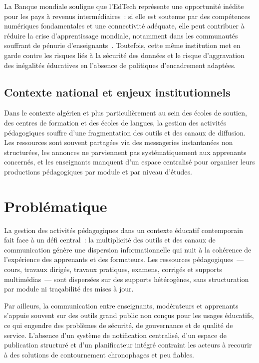 \documentclass[12pt,a4paper,oneside]{report}
\begin{document}
La Banque mondiale souligne que l'EdTech repr\'esente une opportunit\'e in\'edite pour les pays \`a revenus interm\'ediaires~: si elle est soutenue par des comp\'etences num\'eriques fondamentales et une connectivit\'e ad\'equate, elle peut contribuer \`a r\'eduire la crise d'apprentissage mondiale, notamment dans les communaut\'es souffrant de p\'enurie d'enseignants~\cite{worldbank_edtech_2026}. Toutefois, cette m\^eme institution met en garde contre les risques li\'es \`a la s\'ecurit\'e des donn\'ees et le risque d'aggravation des in\'egalit\'es \'educatives en l'absence de politiques d'encadrement adapt\'ees.

\subsection{Contexte national et enjeux institutionnels}

Dans le contexte alg\'erien et plus particuli\`erement au sein des écoles de soutien, des centres de formation et des écoles de langues, la gestion des activit\'es p\'edagogiques souffre d'une fragmentation des outils et des canaux de diffusion. Les ressources sont souvent partag\'ees via des messageries instantan\'ees non structur\'ees, les annonces ne parviennent pas syst\'ematiquement aux apprenants concern\'es, et les enseignants manquent d'un espace centralis\'e pour organiser leurs productions p\'edagogiques par module et par niveau d'\'études.

\section{Probl\'ematique}
\label{sec:problématique}

La gestion des activit\'es p\'edagogiques dans un contexte éducatif contemporain fait face \`a un d\'efi central~: la multiplicit\'e des outils et des canaux de communication g\'en\`ere une dispersion informationnelle qui nuit \`a la coh\'erence de l'exp\'erience des apprenants et des formateurs. Les ressources p\'edagogiques~--- cours, travaux dirig\'es, travaux pratiques, examens, corrig\'es et supports multim\'edias~--- sont dispers\'ees sur des supports h\'et\'erog\`enes, sans structuration par module ni tra\c{c}abilit\'e des mises \`a jour.

Par ailleurs, la communication entre enseignants, mod\'erateurs et apprenants s'appuie souvent sur des outils grand public non con\c{c}us pour les usages éducatifs, ce qui engendre des probl\`emes de s\'ecurit\'e, de gouvernance et de qualit\'e de service. L'absence d'un syst\`eme de notification centralis\'e, d'un espace de publication structur\'e et d'un planificateur int\'egr\'e contraint les acteurs \`a recourir \`a des solutions de contournement chronophages et peu fiables.
\end{document}
